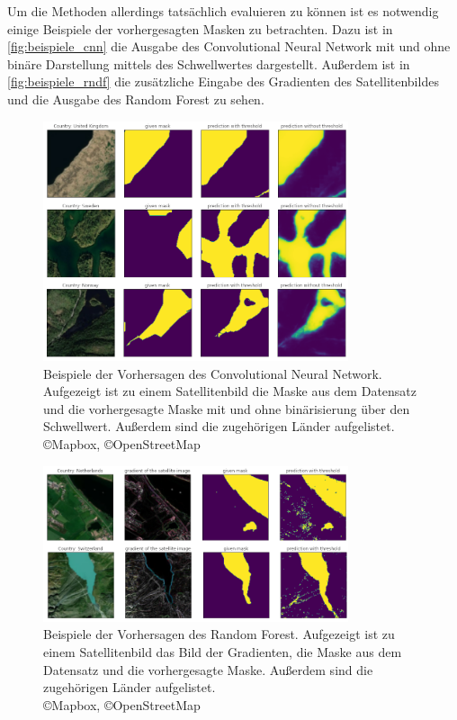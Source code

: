 Um die Methoden allerdings tatsächlich evaluieren zu können ist es notwendig einige Beispiele der vorhergesagten Masken zu betrachten.
Dazu ist in \autoref{fig:beispiele_cnn} die Ausgabe des Convolutional Neural Network mit und ohne binäre Darstellung mittels des Schwellwertes dargestellt.
Außerdem ist in \autoref{fig:beispiele_rndf} die zusätzliche Eingabe des Gradienten des Satellitenbildes und die Ausgabe des Random Forest zu sehen.

\begin{figure}
    \centering
    \includegraphics[width=0.8\textwidth]{images/bsp_cnn.png}
    \caption{Beispiele der Vorhersagen des Convolutional Neural Network. %
    Aufgezeigt ist zu einem Satellitenbild die Maske aus dem Datensatz und %
    die vorhergesagte Maske mit und ohne binärisierung über den Schwellwert. %
    Außerdem sind die zugehörigen Länder aufgelistet.\\ \copyright Mapbox, \copyright OpenStreetMap}
    \label{fig:beispiele_cnn}
\end{figure}

\begin{figure}
    \centering
    \includegraphics[width=0.8\textwidth]{images/bsp_rndf.png}
    \caption{Beispiele der Vorhersagen des Random Forest. %
    Aufgezeigt ist zu einem Satellitenbild das Bild der Gradienten, %
    die Maske aus dem Datensatz und %
    die vorhergesagte Maske. %
    Außerdem sind die zugehörigen Länder aufgelistet.\\ \copyright Mapbox, \copyright OpenStreetMap}
    \label{fig:beispiele_rndf}
\end{figure}

